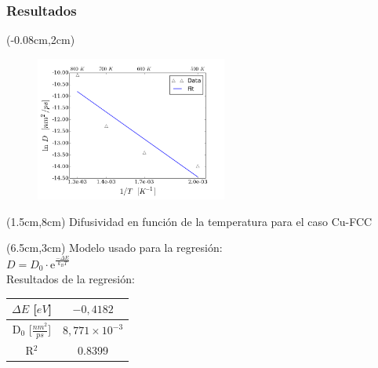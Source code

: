 \begin{frame}
 \frametitle{Resultados}
 
  \begin{textblock*}{6.5cm}(-0.08cm,2cm) 
   \begin{figure}[htp]
    \centering
    \includegraphics[width=6.3cm]{../Figures/Cap_4/FCCDiff_vs_temp_fit.png}
   \end{figure}
  \end{textblock*}
  \begin{textblock*}{10cm}(1.5cm,8cm) 
    \centering
    Difusividad en función de la temperatura para el caso Cu-FCC
  \end{textblock*}
  
  \begin{textblock*}{6cm}(6.5cm,3cm)
    Modelo usado para la regresión: \\
    $D = D_{0}\cdot \mathrm{e}^{\frac{-\Delta E}{k_{B} T}}$\\
    \vspace{0.5cm}
    Resultados de la regresión:
    \begin{table}[htp]
      \begin{center}
      \begin{tabular}{*{2}{c}}
      \hline
      $\Delta E$ [$eV$]& $-0,4182$ \\
      \hline
      D$_{0}$ [$\frac{nm^{2}}{ps}$] & $8,771\times 10^{-3}$\\
      \hline
      R$^{2}$ & 0.8399 \\
      \hline
      \end{tabular}
      \end{center}
      \end{table}    
  \end{textblock*} 
\end{frame}

